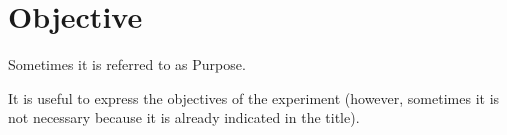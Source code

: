 \section{Objective}
Sometimes it is referred to as Purpose.

It is useful to express the objectives of the experiment (however, sometimes it is not necessary because it is already indicated in the title).
